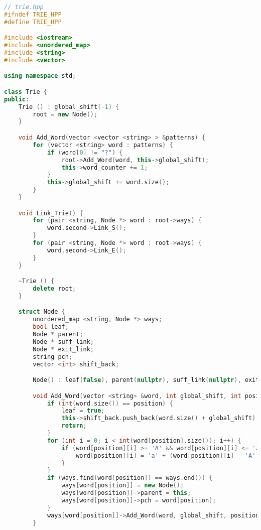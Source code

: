 \begin{lstlisting}[language=C++]
// trie.hpp
#ifndef TRIE_HPP
#define TRIE_HPP

#include <iostream>
#include <unordered_map>
#include <string>
#include <vector>

using namespace std;

class Trie {
public:
    Trie () : global_shift(-1) {
        root = new Node();
    }

    void Add_Word(vector <vector <string> > &patterns) {
        for (vector <string> word : patterns) {
            if (word[0] != "?") {
                root->Add_Word(word, this->global_shift);
                this->word_counter += 1;
            }
            this->global_shift += word.size();
        }
    }

    void Link_Trie() {
        for (pair <string, Node *> word : root->ways) {
            word.second->Link_S();
        }
        for (pair <string, Node *> word : root->ways) {
            word.second->Link_E();
        }
    }

    ~Trie () {
        delete root;
    }

    struct Node {
        unordered_map <string, Node *> ways;
        bool leaf;
        Node * parent;
        Node * suff_link;
        Node * exit_link;
        string pch;
        vector <int> shift_back;

        Node() : leaf(false), parent(nullptr), suff_link(nullptr), exit_link(nullptr) {}

        void Add_Word(vector <string> &word, int global_shift, int position = 0) {
            if (int(word.size()) == position) {
                leaf = true;
                this->shift_back.push_back(word.size() + global_shift);
                return;
            }
            for (int i = 0; i < int(word[position].size()); i++) {
                if (word[position][i] >= 'A' && word[position][i] <= 'Z') {
                    word[position][i] = 'a' + (word[position][i] - 'A');
                }
            }
            if (ways.find(word[position]) == ways.end()) {
                ways[word[position]] = new Node();
                ways[word[position]]->parent = this;
                ways[word[position]]->pch = word[position];
            }
            ways[word[position]]->Add_Word(word, global_shift, position + 1);
        }


\end{lstlisting}
